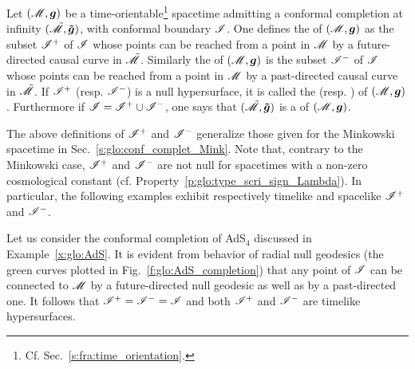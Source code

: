 \begin{greybox}
Let $(\mathscr{M},\bm{g})$ be a time-orientable\footnote{Cf. Sec.~\ref{s:fra:time_orientation}.} spacetime admitting a conformal completion at infinity $(\tilde{\mathscr{M}},\bm{\tilde{g}})$, with conformal boundary $\mathscr{I}$.
One defines the  of $(\mathscr{M},\bm{g})$ as the subset $\mathscr{I}^+$ of $\mathscr{I}$ whose points can be reached from a point in $\mathscr{M}$ by a future-directed causal curve in $\tilde{\mathscr{M}}$.
Similarly the   of $(\mathscr{M},\bm{g})$ is the subset $\mathscr{I}^-$ of
$\mathscr{I}$ whose points can be reached from a point in $\mathscr{M}$ by a past-directed causal curve in $\tilde{\mathscr{M}}$.
If $\mathscr{I}^+$ (resp. $\mathscr{I}^-$) is a null hypersurface, it is called the
(resp. )
of $(\mathscr{M},\bm{g})$.
Furthermore if $\mathscr{I} = \mathscr{I}^+ \cup \mathscr{I}^-$, one says that $(\tilde{\mathscr{M}},\bm{\tilde{g}})$ is a
of $(\mathscr{M},\bm{g})$.
\end{greybox}


\begin{remark}
The above definitions of $\mathscr{I}^+$ and $\mathscr{I}^-$
generalize those given for the Minkowski spacetime in Sec.~\ref{s:glo:conf_complet_Mink}.
Note that, contrary to the Minkowski case, $\mathscr{I}^+$ and $\mathscr{I}^-$ are not null
for spacetimes with a non-zero cosmological constant (cf. Property~\ref{p:glo:type_scri_sign_Lambda}).
In particular, the following
examples exhibit respectively timelike and spacelike $\mathscr{I}^+$ and $\mathscr{I}^-$.
\end{remark}

\begin{example}
Let us consider the conformal completion of AdS$_{4}$ discussed in Example~\ref{x:glo:AdS}.
It is evident from behavior of radial null geodesics (the green curves plotted in Fig.~\ref{f:glo:AdS_completion}) that any point of $\mathscr{I}$ can be connected to $\mathscr{M}$ by a
future-directed null geodesic as well as by a past-directed one. It follows that
$\mathscr{I}^+ = \mathscr{I}^- = \mathscr{I}$ and both $\mathscr{I}^+$ and $\mathscr{I}^-$ are timelike hypersurfaces.
\end{example}

